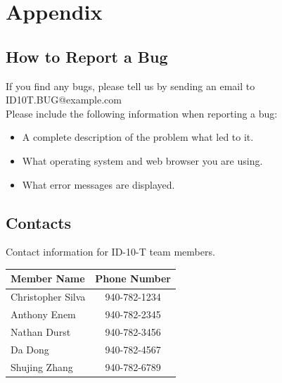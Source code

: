 \documentclass{scrreprt}
\begin{document}
	{\let\clearpage\relax \chapter{Appendix}}
	
	\section{How to Report a Bug}
	If you find any bugs, please tell us by sending an email to ID10T.BUG@example.com\\
	Please include the following information when reporting a bug:\\
	\begin{itemize}
		\item A complete description of the problem what led to it.
		\item What operating system and web browser you are using.
		\item What error messages are displayed.
	\end{itemize}
	
	\section{Contacts}
		Contact information for ID-10-T team members.\\
		\begin{tabular}{|l|c|}
			\hline
			Member Name       & Phone Number \\ \hline
			Christopher Silva & 940-782-1234 \\ \hline
			Anthony Enem      & 940-782-2345 \\ \hline
			Nathan Durst      & 940-782-3456 \\ \hline
			Da Dong           & 940-782-4567 \\ \hline
			Shujing Zhang     & 940-782-6789 \\ \hline
		\end{tabular}
\end{document}
